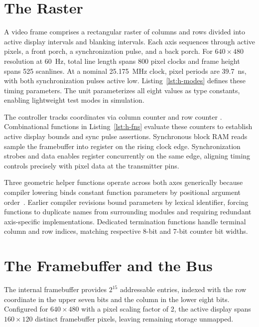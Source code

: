 \documentclass[journal,9pt]{IEEEtran}
\newcommand{\hdmipart}[3]{%
}
\begin{document}
\section{The Raster}
\label{sec:h-raster}

A video frame comprises a rectangular raster of columns and rows divided
into active display intervals and blanking intervals. Each axis sequences
through active pixels, a front porch, a synchronization pulse, and a back
porch. For $640 \times 480$ resolution at 60~Hz, total line length spans 800
pixel clocks and frame height spans 525 scanlines. At a nominal 25.175~MHz
clock, pixel periods are 39.7~ns, with both synchronization pulses active
low. Listing~\ref{lst:h-modes} defines these timing parameters. The unit
parameterizes all eight values as type constants, enabling lightweight
test modes in simulation.

\hdmipart{modes}{640 by 480 at 60~Hz.}{lst:h-modes}

The controller tracks coordinates via column counter  and row
counter . Combinational functions in Listing~\ref{lst:h-fns}
evaluate these counters to establish active display bounds and sync pulse
assertions. Synchronous block RAM reads sample the framebuffer into register
 on the rising clock edge. Synchronization strobes and data
enables register concurrently on the same edge, aligning timing controls
precisely with pixel data at the transmitter pins.

Three geometric helper functions operate across both axes generically
because compiler lowering binds constant function parameters by positional
argument order~\cite{i127}. Earlier compiler revisions bound parameters
by lexical identifier, forcing functions to duplicate names from
surrounding modules and requiring redundant axis-specific implementations.
Dedicated termination functions handle terminal column and row indices,
matching respective 8-bit and 7-bit counter bit widths.

\hdmipart{fns}{The raster's functions.}{lst:h-fns}

\section{The Framebuffer and the Bus}
\label{sec:h-bus}

The internal framebuffer provides $2^{15}$ addressable entries, indexed
with the row coordinate in the upper seven bits and the column in the lower
eight bits. Configured for $640 \times 480$ with a pixel scaling factor
 of 2, the active display spans $160 \times 120$ distinct
framebuffer pixels, leaving remaining storage unmapped.
\end{document}
